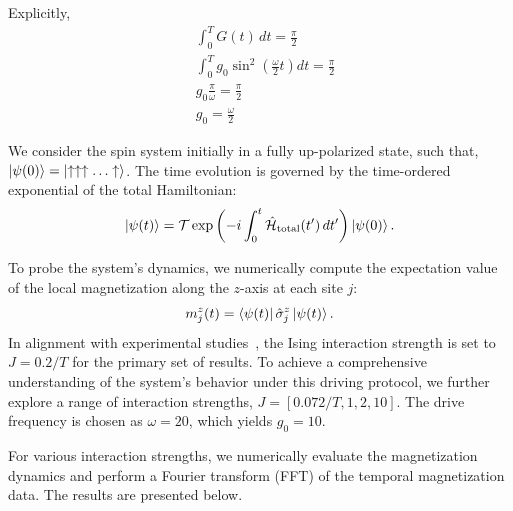 \documentclass[a4paper, 11pt]{article}
\begin{document}
Explicitly,
\begin{align*}
    &\int_0^T G(t)\,dt = \frac{\pi}{2} \\
    &\int_0^T g_0\sin^2\left(\frac{\omega}{2}t \right) dt = \frac{\pi}{2}\\
    &g_0 \frac{\pi}{\omega} = \frac{\pi}{2}\\
    &\boxed{g_0 = \frac{\omega}{2}}
\end{align*}
 



We consider the spin system initially in a fully up-polarized state, such that, $\displaystyle\ket{\psi(0)} = \ket{\uparrow\uparrow\uparrow\ldots\uparrow}$. The time evolution is governed by the time-ordered exponential of the total Hamiltonian:
\begin{equation}
    \ket{\psi(t)} = \mathcal{T} \exp\left(-i\int_0^t \hat{\mathcal{H}}_{\text{total}}(t')\,dt'\right) \ket{\psi(0)}.
\end{equation}

To probe the system's dynamics, we numerically compute the expectation value of the local magnetization along the $z$-axis at each site $j$:
\begin{equation}
    m_j^z(t) = \bra{\psi(t)} \hat{\sigma}_j^z \ket{\psi(t)}.
\end{equation}  
In alignment with experimental studies~\cite{Zhang2017}, the Ising interaction strength is set to $J = 0.2/T$ for the primary set of results. To achieve a comprehensive understanding of the system's behavior under this driving protocol, we further explore a range of interaction strengths, $J = [0.072/T, 1, 2, 10]$. The drive frequency is chosen as $\omega = 20$, which yields $g_0 = 10$.

For various interaction strengths, we numerically evaluate the magnetization dynamics and perform a Fourier transform (FFT) of the temporal magnetization data. The results are presented below.

\newpage
\end{document}
